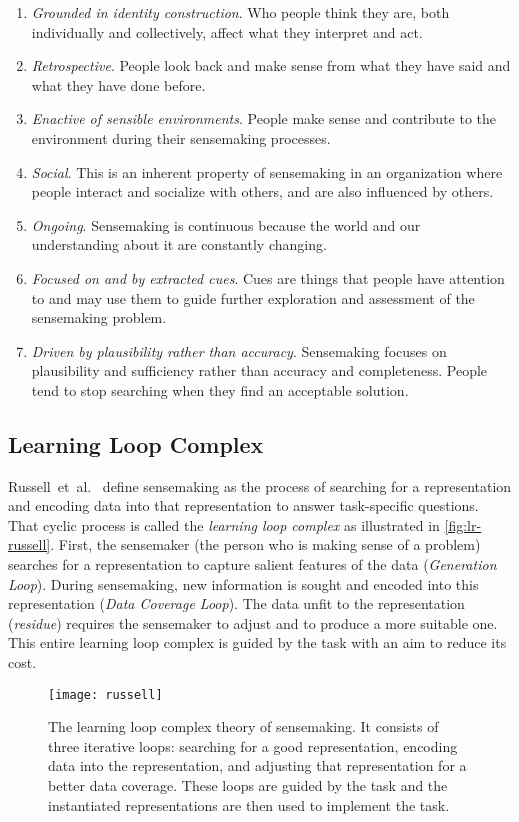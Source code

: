 \begin{enumerate}
	\item \emph{Grounded in identity construction}. Who people think they are, both individually and collectively, affect what they interpret and act.
	\item \emph{Retrospective}. People look back and make sense from what they have said and what they have done before.
	\item \emph{Enactive of sensible environments}. People make sense and contribute to the environment during their sensemaking processes.
	\item \emph{Social}. This is an inherent property of sensemaking in an organization where people interact and socialize with others, and are also influenced by others.
	\item \emph{Ongoing}. Sensemaking is continuous because the world and our understanding about it are constantly changing.
	\item \emph{Focused on and by extracted cues}. Cues are things that people have attention to and may use them to guide further exploration and assessment of the sensemaking problem.
	\item \emph{Driven by plausibility rather than accuracy}. Sensemaking focuses on plausibility and sufficiency rather than accuracy and completeness. People tend to stop searching when they find an acceptable solution.
\end{enumerate}

\subsection{Learning Loop Complex}
Russell~et~al.~\cite{Russell1993} define sensemaking as the process of searching for a representation and encoding data into that representation to answer task-specific questions. That cyclic process is called the \emph{learning loop complex} as illustrated in \autoref{fig:lr-russell}. First, the sensemaker (the person who is making sense of a problem) searches for a representation to capture salient features of the data (\emph{Generation Loop}). During sensemaking, new information is sought and encoded into this representation (\emph{Data Coverage Loop}). The data unfit to the representation (\emph{residue}) requires the sensemaker to adjust and to produce a more suitable one. This entire learning loop complex is guided by the task with an aim to reduce its cost.

\begin{figure}
	\centering
	\texttt{[image: russell]}
	\caption[The learning loop complex theory of sensemaking]{The learning loop complex theory of sensemaking. It consists of three iterative loops: searching for a good representation, encoding data into the representation, and adjusting that representation for a better data coverage. These loops are guided by the task and the instantiated representations are then used to implement the task. }
	\label{fig:lr-russell}
\end{figure}

